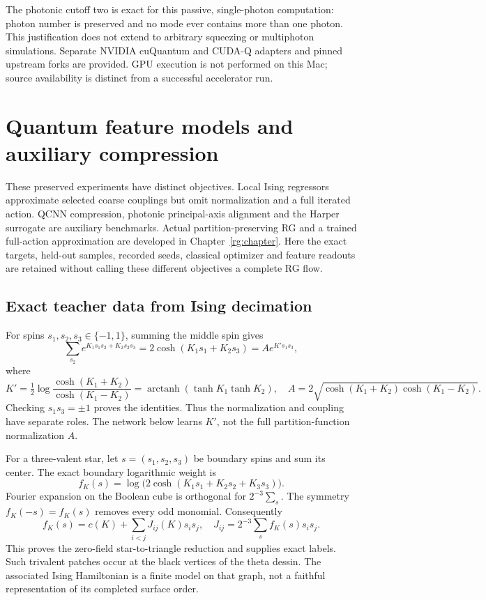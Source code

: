 The photonic cutoff two is exact for this passive, single-photon computation: photon number is preserved and no mode ever contains more than one photon. This justification does not extend to arbitrary squeezing or multiphoton simulations. Separate NVIDIA cuQuantum and CUDA-Q adapters and pinned upstream forks are provided. GPU execution is not performed on this Mac; source availability is distinct from a successful accelerator run.

\chapter{Quantum feature models and auxiliary compression}
\label{book:learning}
These preserved experiments have distinct objectives. Local Ising regressors approximate selected coarse couplings but omit normalization and a full iterated action. QCNN compression, photonic principal-axis alignment and the Harper surrogate are auxiliary benchmarks. Actual partition-preserving RG and a trained full-action approximation are developed in Chapter~\ref{rg:chapter}. Here the exact targets, held-out samples, recorded seeds, classical optimizer and feature readouts are retained without calling these different objectives a complete RG flow.

\section{Exact teacher data from Ising decimation}
For spins $s_1,s_2,s_3\in\{-1,1\}$, summing the middle spin gives
\[
 \sum_{s_2}e^{K_1s_1s_2+K_2s_2s_3}
 =2\cosh(K_1s_1+K_2s_3)
 =A e^{K' s_1s_3},
\]
where
\[
 K'=\tfrac12\log\frac{\cosh(K_1+K_2)}{\cosh(K_1-K_2)}
 =\operatorname{arctanh}(\tanh K_1\tanh K_2),\quad
 A=2\sqrt{\cosh(K_1+K_2)\cosh(K_1-K_2)}.
\]
Checking $s_1s_3=\pm1$ proves the identities. Thus the normalization and coupling have separate roles. The network below learns $K'$, not the full partition-function normalization $A$.

For a three-valent star, let $s=(s_1,s_2,s_3)$ be boundary spins and sum its center. The exact boundary logarithmic weight is
\[
 f_K(s)=\log\bigl(2\cosh(K_1s_1+K_2s_2+K_3s_3)\bigr).
\]
Fourier expansion on the Boolean cube is orthogonal for $2^{-3}\sum_s$. The symmetry $f_K(-s)=f_K(s)$ removes every odd monomial. Consequently
\[
 f_K(s)=c(K)+\sum_{i<j}J_{ij}(K)s_is_j,\quad
 J_{ij}=2^{-3}\sum_s f_K(s)s_is_j.
\]
This proves the zero-field star-to-triangle reduction and supplies exact labels. Such trivalent patches occur at the black vertices of the theta dessin. The associated Ising Hamiltonian is a finite model on that graph, not a faithful representation of its completed surface order.

